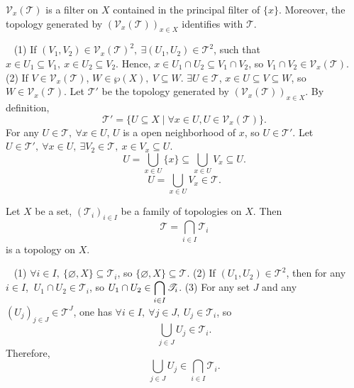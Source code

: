 \begin{propositionenv}
    $\mathcal{V}_x(\mathscr{T})$ is a filter on $X$ contained in the principal filter of $\{x\}$. Moreover, the topology generated by $\left(\mathcal{V}_x(\mathscr{T})\right)_{x\in X}$ identifies with $\mathscr{T}$.
\end{propositionenv}
\begin{proofenv}
    \ \newline
    (1) If $(V_1,V_2)\in \mathcal{V}_x(\mathscr{T})^2,\ \exists (U_1,U_2)\in \mathscr{T}^2$, such that $x\in U_1\subseteq V_1,\ x\in U_2\subseteq V_2$. Hence, $x\in U_1\cap U_2\subseteq V_1\cap V_2$, so $V_1\cap V_2\in \mathcal{V}_{x}(\mathscr{T})$.
    \newline
    (2) If $V\in \mathcal{V}_x(\mathscr{T})$, $W\in \wp(X),\ V\subseteq W$. $\exists U\in \mathscr{T}$, $x\in U\subseteq V\subseteq W$, so $W\in \mathcal{V}_x(\mathscr{T})$. Let $\mathscr{T}'$ be the topology generated by $\left(\mathcal{V}_x(\mathscr{T})\right)_{x\in X}$. By definition,
    $$\mathscr{T}'=\{U\subseteq X\mid \forall x\in U, U\in \mathcal{V}_x(\mathscr{T})\}.$$
    For any $U\in \mathscr{T},\ \forall x\in U  $, $U$ is a open neighborhood of $x$, so $U\in \mathscr{T}'$. Let $U\in \mathscr{T}', \ \forall x\in U,\ \exists V_2\in \mathscr{T},\ x\in V_x\subseteq U$.
    $$U=\bigcup_{x\in U}\{x\}\subseteq \bigcup_{x\in U}V_x\subseteq U.$$
    $$U=\bigcup_{x\in U}V_x\in \mathscr{T}.$$
\end{proofenv}
\begin{propositionenv}
    Let $X$ be a set, $\left(\mathscr{T}_i\right)_{i\in I}$ be a family of topologies on $X$. Then 
    $$\mathscr{T}=\bigcap_{i\in I}\mathscr{T}_i$$
    is a topology on $X$.
\end{propositionenv}
\begin{proofenv}
    \ \newline
    (1) $\forall i\in I,\ \{\varnothing,X\}\subseteq \mathscr{T}_i$, so $\{\varnothing,X\}\subseteq \mathscr{T}$.
    \newline
    (2) If $(U_1,U_2)\in \mathscr{T}^2$, then for any $i\in I$, $\ U_1\cap U_2\in \mathscr{T}_i$, so $\displaystyle U_1\cap U_2\in \bigcap_{i\in I}\mathscr{T}_i$.
    \newline
    (3) For any set $J$ and any $\left(U_j\right)_{j\in J}\in \mathscr{T}^J$, one has $\forall i\in I,\ \forall j\in J,\ U_j\in \mathscr{T}_i$, so
    $$\bigcup_{j\in J}U_j\in \mathscr{T}_i.$$
    Therefore, $$\bigcup_{j\in J}U_j\in \bigcap_{i\in I}\mathscr{T}_i.$$ 
\end{proofenv}
